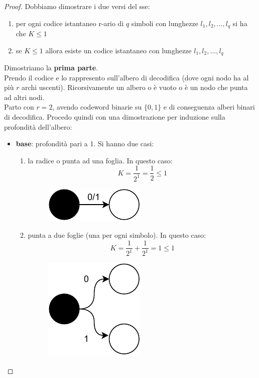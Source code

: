 \documentclass[a4paper,12pt, oneside]{book}
\begin{document}
\begin{proof}
  Dobbiamo dimostrare i due versi del sse:
  \begin{enumerate}
    \item per ogni codice istantaneo r-ario di $q$ simboli con lunghezze
    $l_1,l_2,\ldots,l_q$ si ha che $K\leq 1$
    \item se $K\leq 1$ allora esiste un codice istantaneo con lunghezze
    $l_1,l_2,\ldots,l_q$ 
  \end{enumerate}
  Dimostriamo la \textbf{prima parte}.\\
  Prendo il codice e lo rappresento sull'albero di decodifica (dove ogni nodo ha
  al più $r$ archi uscenti). Ricorsivamente un albero o è vuoto o è un nodo che
  punta ad altri nodi.\\
  Parto con $r=2$, avendo codeword binarie su $\{0,1\}$ e di conseguenza alberi
  binari di decodifica. Procedo quindi con una dimostrazione per induzione sulla
  profondità dell'albero:
  \begin{itemize}
    \item \textbf{base}: profondità pari a 1. Si hanno due casi:
    \begin{enumerate}
      \item la radice o punta ad una foglia. In questo caso:
      \[K=\frac{1}{2^1}=\frac{1}{2}\leq 1\]
      \begin{figure}[H]
        \centering
        \includegraphics[scale = 0.7]{img/ct6.pdf}
      \end{figure}
      \item punta a due foglie (una per ogni simbolo). In questo caso:
      \[K=\frac{1}{2^1}+\frac{1}{2^1}=1\leq 1\]
      \begin{figure}[H]
        \centering
        \includegraphics[scale = 0.7]{img/ct5.pdf}
      \end{figure}
    \end{enumerate}
    

\end{itemize}
\end{proof}
\end{document}
